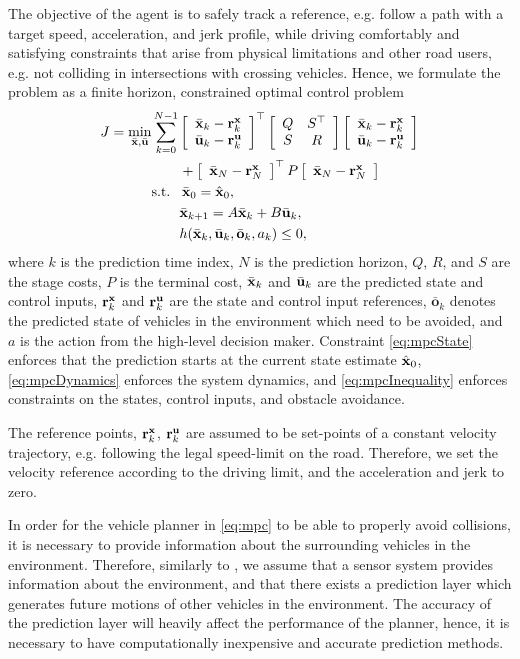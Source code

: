 The objective of the agent is to safely track a reference, e.g. follow a path with a target speed, acceleration, and jerk profile, while driving comfortably and satisfying constraints that arise from physical limitations and other road users, e.g. not colliding in intersections with crossing vehicles. Hence, we formulate  the  problem as a finite horizon, constrained optimal control problem
\begin{subequations}
	\label{eq:mpc2}
	\begin{align}
	J = \min_{\bar\x,\bar\u} & \sum_{k=0}^{N-1}%
	\matr{c}{\bar\x_k - \r_k^\x \\ \bar\u_k - \r_k^\u}^\top \matr{cc}{Q &S^\top\\S & R} \matr{c}{\bar\x_k - \r_k^\x \\ \bar\u_k - \r_k^\u} \\
	&\qquad + \matr{c}{\bar\x_N - \r_N^\x}^\top P \matr{c}{\bar\x_N - \r_N^\x}\nonumber\\
	&\text{s.t.}\ \ \, \bar\x_0 = \hat{\x}_0, \label{eq:mpcState2}\\
	&\qquad{}\bar\x_{k+1} = A\bar\x_{k}+B\bar\u_{k},\label{eq:mpcDynamics2}\\
	&\qquad{}h(\bar\x_k,\bar\u_k,\bar{\mathbf{o}}_k,a_k) \leq{} 0, \label{eq:mpcInequality2}
	\end{align}
\end{subequations}
where $k$ is  the prediction time index, $N$ is the prediction horizon, $Q$, $R$, and $S$ are the stage costs, $P$ is the terminal cost, $\bar{{\mathbf{x}}}_k$ and $ \bar{{\mathbf{u}}}_k$ are the predicted state and control inputs, ${\mathbf{r}}^{\mathbf{x}}_k$ and ${\mathbf{r}}^{\mathbf{u}}_k$ are the state and control input references, $\bar{\mathbf{o}}_k$ denotes the predicted state of vehicles in the environment which need to be avoided, and $a$ is the action from the high-level decision maker. Constraint \eqref{eq:mpcState} enforces that the prediction starts  at the current state estimate $\hat{{\mathbf{x}}}_0$, \eqref{eq:mpcDynamics} enforces the system dynamics, and \eqref{eq:mpcInequality} enforces constraints on the states, control inputs, and obstacle avoidance.

The reference points, ${\mathbf{r}}^{\mathbf{x}}_k$, ${\mathbf{r}}^{\mathbf{u}}_k$ are assumed to be set-points of a constant velocity trajectory, e.g. following the legal speed-limit on the road. Therefore, we set the velocity reference according to the driving limit, and the acceleration and jerk to zero.


In order for the vehicle planner in \eqref{eq:mpc} to be able to properly avoid collisions, it is necessary to provide information about the surrounding vehicles in the environment. Therefore, similarly to \cite{batkovic2019}, we assume that a sensor system provides information about the environment, and that there exists a prediction layer which generates future motions of other vehicles in the environment. The accuracy of the prediction layer will heavily affect the performance of the planner, hence, it is necessary to have computationally inexpensive and accurate prediction methods.

